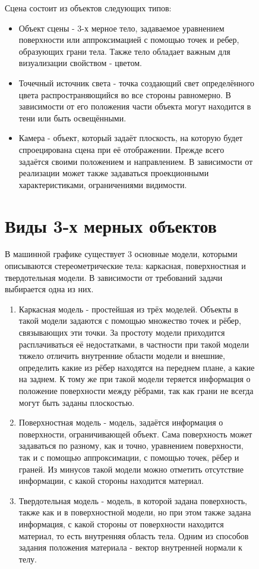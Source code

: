 \begin{figure}[h]
Сцена состоит из объектов следующих типов:
\begin{itemize}
	\item Объект сцены - 3-х мерное тело, задаваемое уравнением поверхности или аппроксимацией с помощью точек и ребер, образующих грани тела. Также тело обладает важным для визуализации свойством - цветом.
	\item Точечный источник света - точка создающий свет определённого цвета распространяющийся во все стороны равномерно. В зависимости от его положения части объекта могут находится в тени или быть освещёнными.
	\item Камера - объект, который задаёт плоскость, на которую будет спроецирована сцена при её отображении. Прежде всего задаётся своими положением и направлением. В зависимости от реализации может также задаваться проекционными характеристиками, ограничениями видимости.
\end{itemize}

\section{Виды 3-х мерных объектов}
В машинной графике существует 3 основные модели, которыми описываются стереометрические тела: каркасная, поверхностная и твердотельная модели. В зависимости от требований задачи выбирается одна из них.

\begin{enumerate}
	\item Каркасная модель - простейшая из трёх моделей. Объекты в такой модели задаются с помощью множество точек и рёбер, связывающих эти точки. За простоту модели приходится расплачиваться её недостатками, в частности при такой модели тяжело отличить внутренние области модели и внешние, определить какие из рёбер находятся на переднем плане, а какие на заднем. К тому же при такой модели теряется информация о положение поверхности между рёбрами, так как грани не всегда могут быть заданы плоскостью.
	\item Поверхностная модель - модель, задаётся информация о поверхности, ограничивающей объект. Сама поверхность может задаваться по разному, как и точно, уравнением поверхности, так и с помощью аппроксимации, с помощью точек, рёбер и граней. Из минусов такой модели можно отметить отсутствие информации, с какой стороны находится материал.
	\item Твердотельная модель - модель, в которой задана поверхность, также как и в поверхностной модели, но при этом также задана информация, с какой стороны от поверхности находится материал, то есть внутренняя область тела. Одним из способов задания положения материала - вектор внутренней нормали к телу.
\end{enumerate}


\end{figure}
